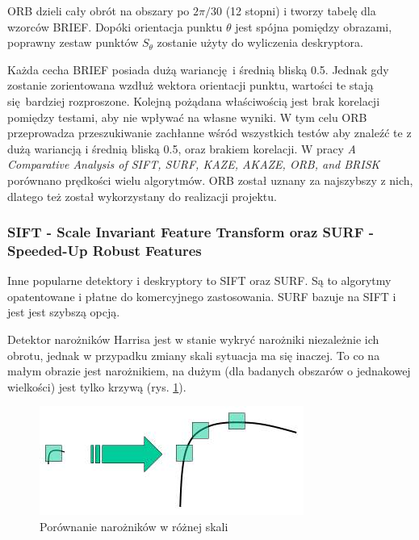 \documentclass[12pt,twoside,polish]{article}
\begin{document}
ORB dzieli cały obrót na obszary po $2\pi/30$ (12 stopni) i tworzy tabelę dla wzorców BRIEF. Dopóki orientacja punktu $\theta$ jest spójna pomiędzy obrazami, poprawny zestaw punktów $S_\theta$ zostanie użyty do wyliczenia deskryptora.

Każda cecha BRIEF posiada dużą wariancję i średnią bliską 0.5. Jednak gdy zostanie zorientowana wzdłuż wektora orientacji punktu, wartości te stają się bardziej rozproszone. Kolejną pożądana właściwością jest brak korelacji pomiędzy testami, aby nie wpływać na własne wyniki. W tym celu ORB przeprowadza przeszukiwanie zachłanne wśród wszystkich testów aby znaleźć te z dużą wariancją i średnią bliską 0.5, oraz brakiem korelacji. W pracy \emph{A Comparative Analysis of SIFT, SURF, KAZE, AKAZE, ORB, and BRISK}\cite{fastest_orb} porównano prędkości wielu algorytmów. ORB został uznany za najszybszy z nich, dlatego też został wykorzystany do realizacji projektu.

\subsubsection[SIFT i SURF]{SIFT - Scale Invariant Feature Transform oraz SURF - Speeded-Up Robust Features}
Inne popularne detektory i deskryptory to SIFT oraz SURF. Są to algorytmy opatentowane i płatne do komercyjnego zastosowania. SURF bazuje na SIFT i jest jest szybszą opcją.

Detektor narożników Harrisa jest w stanie wykryć narożniki niezależnie ich obrotu, jednak w przypadku zmiany skali sytuacja ma się inaczej. To co na małym obrazie jest narożnikiem, na dużym (dla badanych obszarów o jednakowej wielkości) jest tylko krzywą (rys. \ref{sift_scale_invariant_img}).

\begin{figure}[h]
	\centering
	\includegraphics{sift_scale_invariant}
	\caption{Porównanie narożników w różnej skali \cite{sift_scale_invariant}}
	\label{sift_scale_invariant_img}
	\end{figure}
\end{document}
